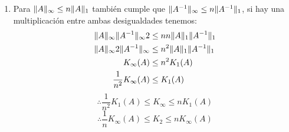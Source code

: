 \begin{enumerate}[label=(\alph*)]
\item Para $ \lVert A\rVert_{\infty} \leq n \lVert A\rVert_{1} $  también cumple que $\lVert A^{-1}\rVert_{\infty} \leq n \lVert A^{-1}\rVert_{1}$, si hay una multiplicación entre ambas desigualdades tenemos:
\begin{align*}
    \lVert A\rVert_{\infty} \lVert A^{-1}\rVert_{\infty}2 &\leq n n \lVert A\rVert_{1} \lVert A^{-1}\rVert_{1}\\
    \lVert A\rVert_{\infty}2 \lVert A^{-1}\rVert_{\infty} &\leq n^2 \lVert A\rVert_{1} \lVert A^{-1}\rVert_{1}\\
    K_{\infty}(A) &\leq n^2K_{1}(A)\\
    \frac{1}{n^2} K_{\infty}(A) &\leq K_{1}(A)\\
\end{align*}
$$
  \therefore  \frac{1}{n^2}K_1(A) \leq K_{\infty} \leq nK_1(A)
$$
$$
\therefore \frac{1}{n}K_{\infty}(A) \leq K_2 \leq nK_{\infty}(A)
$$

\end{enumerate}
